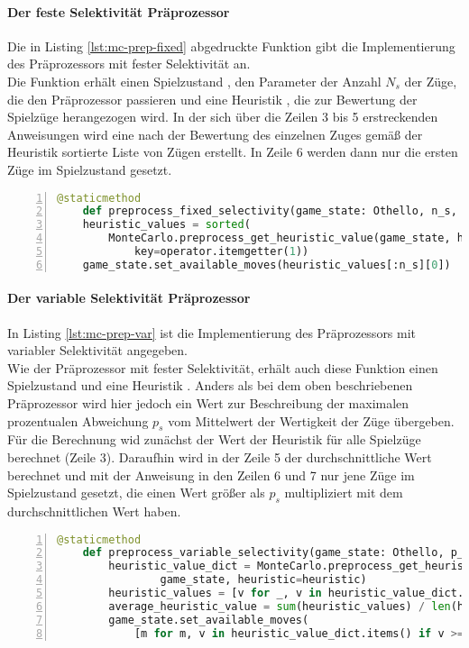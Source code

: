 \paragraph{Der feste Selektivität Präprozessor}
Die in Listing \ref{lst:mc-prep-fixed} abgedruckte Funktion gibt die Implementierung des Präprozessors mit fester Selektivität an.
\\Die Funktion erhält einen Spielzustand , den Parameter  der Anzahl $N_{s}$ der Züge, die den Präprozessor passieren und eine Heuristik , die zur Bewertung der Spielzüge herangezogen wird. In der sich über die Zeilen 3 bis 5 erstreckenden Anweisungen wird eine nach der Bewertung des einzelnen Zuges gemäß der Heuristik sortierte Liste von Zügen erstellt. In Zeile 6 werden dann nur die ersten  Züge im Spielzustand  gesetzt.
\begin{lstlisting}[basicstyle=\footnotesize, caption = {Die Funktion \code{preprocess\_fixed\_slectivity}}, language = python, captionpos = t , numbers=left, label={lst:mc-prep-fixed}]
	@staticmethod	    
	def preprocess_fixed_selectivity(game_state: Othello, n_s, heuristic):
    heuristic_values = sorted(
        MonteCarlo.preprocess_get_heuristic_value(game_state, heuristic=heuristic).items(),
            key=operator.itemgetter(1))
    game_state.set_available_moves(heuristic_values[:n_s][0])
\end{lstlisting}
\paragraph{Der variable Selektivität Präprozessor}
In Listing \ref{lst:mc-prep-var} ist die Implementierung des Präprozessors mit variabler Selektivität angegeben.
\\Wie der Präprozessor mit fester Selektivität, erhält auch diese Funktion einen Spielzustand  und eine Heuristik . Anders als bei dem oben beschriebenen Präprozessor wird hier jedoch ein Wert  zur Beschreibung der maximalen prozentualen Abweichung $p_{s}$ vom Mittelwert der Wertigkeit der Züge übergeben.
\\Für die Berechnung wid zunächst der Wert der Heuristik für alle Spielzüge berechnet (Zeile 3). Daraufhin wird in der Zeile 5 der durchschnittliche Wert berechnet und mit der Anweisung in den Zeilen 6 und 7 nur jene Züge im Spielzustand gesetzt, die einen Wert größer als $p_{s}$ multipliziert mit dem durchschnittlichen Wert haben.
\newpage
\begin{lstlisting}[basicstyle=\footnotesize, caption = {Die Funktion \code{preprocess\_variable\_slectivity}}, language = python, captionpos = t , numbers=left, label={lst:mc-prep-var}]
	@staticmethod
    def preprocess_variable_selectivity(game_state: Othello, p_s, heuristic):
        heuristic_value_dict = MonteCarlo.preprocess_get_heuristic_value(
        		game_state, heuristic=heuristic)
        heuristic_values = [v for _, v in heuristic_value_dict.items()]
        average_heuristic_value = sum(heuristic_values) / len(heuristic_values)
        game_state.set_available_moves(
            [m for m, v in heuristic_value_dict.items() if v >= p_s * average_heuristic_value])
\end{lstlisting}
